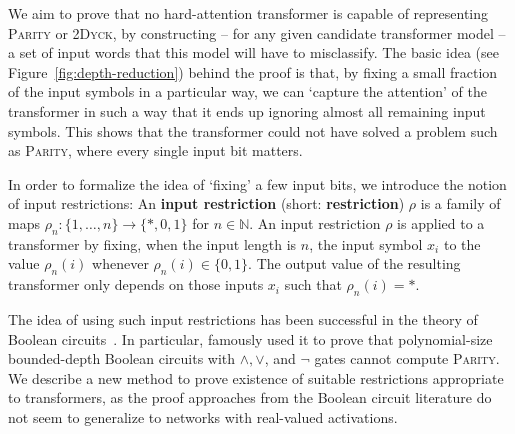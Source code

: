 \documentclass[11pt,a4paper]{article}
\newcommand{\key}[1]{\textbf{#1}}
\begin{document}
We aim to prove that no hard-attention transformer is capable of representing \textsc{Parity} or \textsc{2Dyck}, by constructing -- for any given candidate transformer model -- a set of input words that this model will have to misclassify.
The basic idea (see Figure~\ref{fig:depth-reduction}) behind the proof is that, by fixing a small fraction of the input symbols in a particular way, we can `capture the attention' of the transformer in such a way that it ends up ignoring almost all remaining input symbols.
This shows that the transformer could not have solved a problem such as \textsc{Parity}, where every single input bit matters.



In order to formalize the idea of `fixing'  a few input bits, we introduce the notion of input restrictions:
An \key{input restriction} (short: \key{restriction}) $\rho$ is a family of maps $\rho_n : \{1, \dots, n\} \rightarrow \{*, 0, 1\}$ for $n \in \mathbb{N}$.
An input restriction $\rho$ is applied to a transformer by fixing, when the input length is $n$, the input symbol $x_i$ to the value $\rho_n(i)$ whenever $\rho_n(i) \in \{0, 1\}$.
The output value of the resulting transformer only depends on those inputs $x_i$ such that $\rho_n(i) = *$.

The idea of using such input restrictions has been successful in the theory of Boolean circuits~\cite{furst1984parity,hastad1994optimal}.
In particular, \citet{furst1984parity}  famously used it to prove that polynomial-size bounded-depth Boolean circuits with $\wedge, \vee$, and $\neg$ gates cannot compute \textsc{Parity}.
We describe a new method to prove existence of suitable restrictions appropriate to transformers, as the proof approaches from the Boolean circuit literature do not seem to generalize to networks with real-valued activations.
\end{document}
